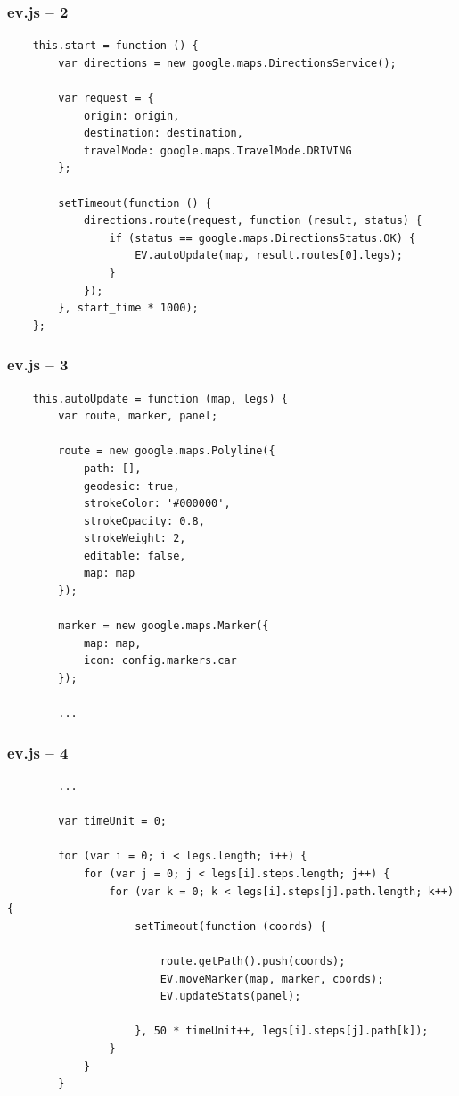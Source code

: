 \begin{frame}[fragile]
\frametitle{ev.js – 2}

\begin{verbatim}
    this.start = function () {
        var directions = new google.maps.DirectionsService();

        var request = {
            origin: origin,
            destination: destination,
            travelMode: google.maps.TravelMode.DRIVING
        };

        setTimeout(function () {
            directions.route(request, function (result, status) {
                if (status == google.maps.DirectionsStatus.OK) {
                    EV.autoUpdate(map, result.routes[0].legs);
                }
            });
        }, start_time * 1000);
    };
\end{verbatim}

\end{frame}
\clearpage



\begin{frame}[fragile]
\frametitle{ev.js – 3}

\begin{verbatim}
    this.autoUpdate = function (map, legs) {
        var route, marker, panel;

        route = new google.maps.Polyline({
            path: [],
            geodesic: true,
            strokeColor: '#000000',
            strokeOpacity: 0.8,
            strokeWeight: 2,
            editable: false,
            map: map
        });

        marker = new google.maps.Marker({
            map: map,
            icon: config.markers.car
        });

        ...
\end{verbatim}

\end{frame}
\clearpage



\begin{frame}[fragile]
\frametitle{ev.js – 4}

\begin{verbatim}
        ...

        var timeUnit = 0;

        for (var i = 0; i < legs.length; i++) {
            for (var j = 0; j < legs[i].steps.length; j++) {
                for (var k = 0; k < legs[i].steps[j].path.length; k++) {
                    setTimeout(function (coords) {

                        route.getPath().push(coords);
                        EV.moveMarker(map, marker, coords);
                        EV.updateStats(panel);

                    }, 50 * timeUnit++, legs[i].steps[j].path[k]);
                }
            }
        }
\end{verbatim}

\end{frame}
\clearpage